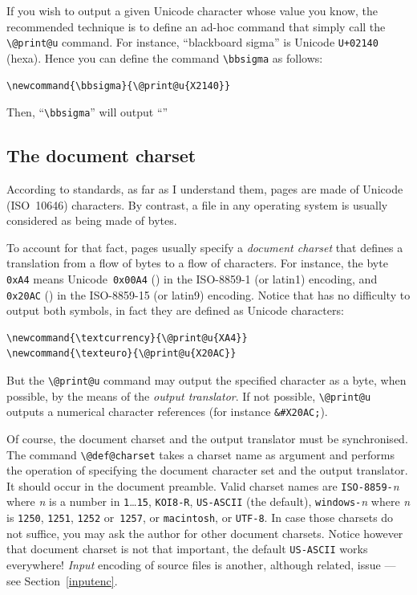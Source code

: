 %
If you wish to output a given Unicode character whose value you know,
the recommended technique is to define an ad-hoc command
that simply call the \verb+\@print@u+ command.
For instance, ``blackboard sigma'' is Unicode \texttt{U+02140} (hexa).
Hence you can define the command \verb+\bbsigma+ as follows:
\begin{verbatim}
\newcommand{\bbsigma}{\@print@u{X2140}}
\end{verbatim}
\ifhevea Then, ``\verb+\bbsigma+'' will output ``''\fi


\subsection{The \label{encodings}document charset}
According to standards, as far as I understand them, \html{} pages are
made of Unicode (ISO~10646) characters.
By contrast, a file in any operating system is usually considered as
being made of bytes.

%
To account for that fact, \html{} pages usually specify a \emph{document
charset} that defines a translation from a flow of bytes to a flow of
characters.
For instance, the byte
\texttt{0xA4} means Unicode~\texttt{0x00A4} (\textcurrency) in the
ISO-8859-1 (or latin1) encoding, and \texttt{0x20AC} (\texteuro) in
the ISO-8859-15 (or latin9) encoding.
Notice that \hevea{} has no difficulty to output both symbols, in fact
they are defined as Unicode characters:
\begin{verbatim}
\newcommand{\textcurrency}{\@print@u{XA4}}
\newcommand{\texteuro}{\@print@u{X20AC}}
\end{verbatim}
But the \verb+\@print@u+ command may output the specified character as
a byte, when possible, by the means of the \emph{output translator}.
If not possible, \verb+\@print@u+ outputs a numerical character
references (for instance \verb+&#X20AC;+).

%
Of course, the document charset and the output translator
must be synchronised. The command \verb+\@def@charset+ takes a
charset name as argument and performs the operation of specifying the
document character set and the output translator. It should occur in
the document preamble.
Valid  charset names are \texttt{ISO-8859-}\textit{n} where \textit{n} is a
number in \texttt{1}\ldots\texttt{15},
\texttt{KOI8-R}, \texttt{US-ASCII} (the
default),
\texttt{windows-}\textit{n} where \textit{n} is
\texttt{1250}, \texttt{1251}, \texttt{1252} or~\texttt{1257},
or \texttt{macintosh}, or \texttt{UTF-8}.
In case those charsets do not suffice, you may ask the author for
other document charsets.  Notice however that document charset is not
that important, the default \texttt{US-ASCII} works everywhere!
\emph{Input} encoding of source files is another, although
related, issue --- see Section~\ref{inputenc}.

